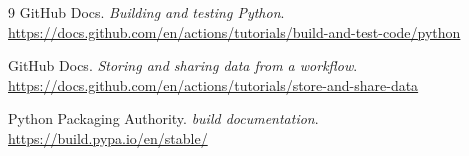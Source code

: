 \documentclass[UTF8,zihao=-4,a4paper]{ctexart}
\begin{document}
\begin{thebibliography}{9}
GitHub Docs. \emph{Building and testing Python}.\\
\url{https://docs.github.com/en/actions/tutorials/build-and-test-code/python}

GitHub Docs. \emph{Storing and sharing data from a workflow}.\\
\url{https://docs.github.com/en/actions/tutorials/store-and-share-data}

Python Packaging Authority. \emph{build documentation}.\\
\url{https://build.pypa.io/en/stable/}
\end{thebibliography}
\end{document}
